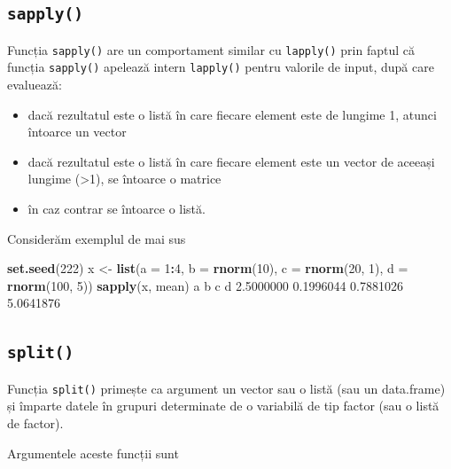 \documentclass[]{article}
\newenvironment{Shaded}{\begin{snugshade}}{\end{snugshade}}
\newcommand{\KeywordTok}[1]{\textcolor[rgb]{0.13,0.29,0.53}{\textbf{#1}}}
\newcommand{\DataTypeTok}[1]{\textcolor[rgb]{0.13,0.29,0.53}{#1}}
\newcommand{\DecValTok}[1]{\textcolor[rgb]{0.00,0.00,0.81}{#1}}
\newcommand{\FloatTok}[1]{\textcolor[rgb]{0.00,0.00,0.81}{#1}}
\newcommand{\StringTok}[1]{\textcolor[rgb]{0.31,0.60,0.02}{#1}}
\newcommand{\OperatorTok}[1]{\textcolor[rgb]{0.81,0.36,0.00}{\textbf{#1}}}
\newcommand{\NormalTok}[1]{#1}
\begin{document}
\subsection{\texorpdfstring{\texttt{sapply()}}{sapply()}}\label{sapply}

Funcția \texttt{sapply()} are un comportament similar cu
\texttt{lapply()} prin faptul că funcția \texttt{sapply()} apelează
intern \texttt{lapply()} pentru valorile de input, după care evaluează:

\begin{itemize}
\item
  dacă rezultatul este o listă în care fiecare element este de lungime
  1, atunci întoarce un vector
\item
  dacă rezultatul este o listă în care fiecare element este un vector de
  aceeași lungime (\textgreater{}1), se întoarce o matrice
\item
  în caz contrar se întoarce o listă.
\end{itemize}

Considerăm exemplul de mai sus

\begin{Shaded}
\begin{Highlighting}[]
\KeywordTok{set.seed}\NormalTok{(}\DecValTok{222}\NormalTok{)}
\NormalTok{x <-}\StringTok{ }\KeywordTok{list}\NormalTok{(}\DataTypeTok{a =} \DecValTok{1}\OperatorTok{:}\DecValTok{4}\NormalTok{, }\DataTypeTok{b =} \KeywordTok{rnorm}\NormalTok{(}\DecValTok{10}\NormalTok{), }\DataTypeTok{c =} \KeywordTok{rnorm}\NormalTok{(}\DecValTok{20}\NormalTok{, }\DecValTok{1}\NormalTok{), }\DataTypeTok{d =} \KeywordTok{rnorm}\NormalTok{(}\DecValTok{100}\NormalTok{, }\DecValTok{5}\NormalTok{))}
\KeywordTok{sapply}\NormalTok{(x, mean)}
\NormalTok{        a         b         c         d }
\FloatTok{2.5000000} \FloatTok{0.1996044} \FloatTok{0.7881026} \FloatTok{5.0641876} 
\end{Highlighting}
\end{Shaded}

\subsection{\texorpdfstring{\texttt{split()}}{split()}}\label{split}

Funcția \texttt{split()} primește ca argument un vector sau o listă (sau
un data.frame) și împarte datele în grupuri determinate de o variabilă
de tip factor (sau o listă de factor).

Argumentele aceste funcții sunt
\end{document}
